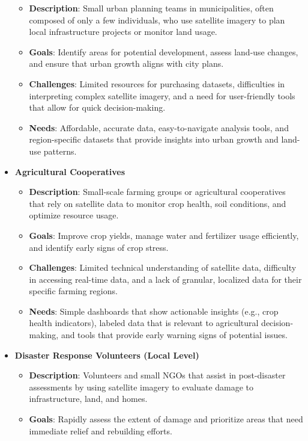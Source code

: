 \documentclass{article}
\begin{document}
\begin{itemize}
    \begin{itemize}
        \item \textbf{Description}: Small urban planning teams in municipalities, often composed of only a few individuals, who use satellite imagery to plan local infrastructure projects or monitor land usage.
        \item \textbf{Goals}: Identify areas for potential development, assess land-use changes, and ensure that urban growth aligns with city plans.
        \item \textbf{Challenges}: Limited resources for purchasing datasets, difficulties in interpreting complex satellite imagery, and a need for user-friendly tools that allow for quick decision-making.
        \item \textbf{Needs}: Affordable, accurate data, easy-to-navigate analysis tools, and region-specific datasets that provide insights into urban growth and land-use patterns.
    \end{itemize}
    \item \textbf{Agricultural Cooperatives}
    \begin{itemize}
        \item \textbf{Description}: Small-scale farming groups or agricultural cooperatives that rely on satellite data to monitor crop health, soil conditions, and optimize resource usage.
        \item \textbf{Goals}: Improve crop yields, manage water and fertilizer usage efficiently, and identify early signs of crop stress.
        \item \textbf{Challenges}: Limited technical understanding of satellite data, difficulty in accessing real-time data, and a lack of granular, localized data for their specific farming regions.
        \item \textbf{Needs}: Simple dashboards that show actionable insights (e.g., crop health indicators), labeled data that is relevant to agricultural decision-making, and tools that provide early warning signs of potential issues.
    \end{itemize}
    \item \textbf{Disaster Response Volunteers (Local Level)}
    \begin{itemize}
        \item \textbf{Description}: Volunteers and small NGOs that assist in post-disaster assessments by using satellite imagery to evaluate damage to infrastructure, land, and homes.
        \item \textbf{Goals}: Rapidly assess the extent of damage and prioritize areas that need immediate relief and rebuilding efforts.

\end{itemize}
\end{itemize}
\end{document}
